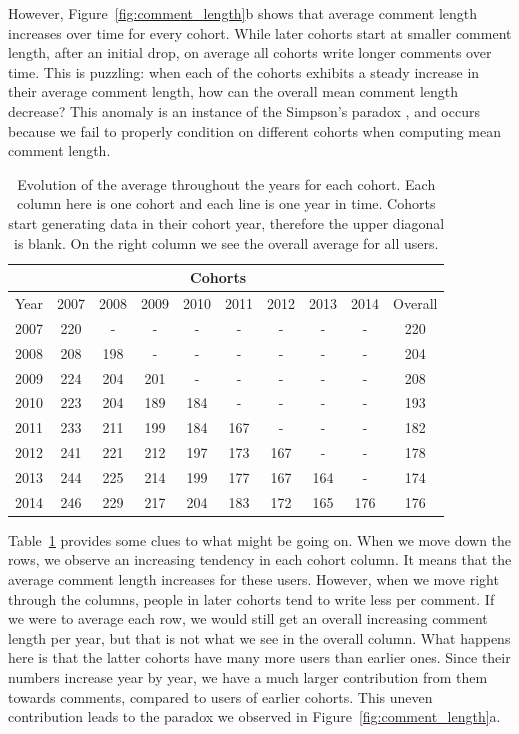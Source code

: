 However, Figure~\ref{fig:comment_length}b shows that average comment length increases over time for every cohort. While later cohorts start at smaller comment length, after an initial drop, on average all cohorts write longer comments over time.  This is puzzling: when each of the cohorts exhibits a steady increase in their average comment length, how can the overall mean comment length decrease?  This anomaly is an instance of the Simpson's paradox \cite{simpson1951}, and occurs because we fail to properly condition on different cohorts when computing mean comment length. 

\begin{table}[!tb]
\centering
\tabcolsep=0.07cm
\singlespacing
\fontsize{9pt}{10.5pt}\selectfont
\begin{tabular}{|c|c|c|c|c|c|c|c|c|c|}
\cline{2-9}
\multicolumn{1}{c|}{} & \multicolumn{8}{c|}{Cohorts} \\ \hline
Year & 2007 & 2008 & 2009 & 2010 & 2011 & 2012 & 2013 & 2014 & Overall\\ \hline
2007 & 220 & - & - & - & - & - & - & - & 220 \\ \hline
2008 & 208 & 198 & - & - & - & - & - & - & 204 \\ \hline
2009 & 224 & 204 & 201 & - & - & - & - & - & 208 \\ \hline
2010 & 223 & 204 & 189 & 184 & - & - & - & - & 193 \\ \hline
2011 & 233 & 211 & 199 & 184 & 167 & - & - & - & 182 \\ \hline
2012 & 241 & 221 & 212 & 197 & 173 & 167 & - & - & 178 \\ \hline
2013 & 244 & 225 & 214 & 199 & 177 & 167 & 164 & - & 174 \\ \hline
2014 & 246 & 229 & 217 & 204 & 183 & 172 & 165 & 176 & 176 \\ \hline
\end{tabular}
\caption{Evolution of the average throughout the years for each cohort. Each column here is one cohort and each line is one year in time. Cohorts start generating data in their cohort year, therefore the upper diagonal is blank. On the right column we see the overall average for all users.}
\label{tab:simpson}
\end{table}

Table~\ref{tab:simpson} provides some clues to what might be going on. When we move down the rows, we observe an increasing tendency in each cohort column. It means that the average comment length increases for these users. However, when we move right through the columns, people in later cohorts tend to write less per comment. If we were to average each row, we would still get an overall increasing comment length per year, but that is not what we see in the overall column. What happens here is that the latter cohorts have many more users than earlier ones. Since their numbers increase year by year, we have a much larger contribution from them towards comments, compared to users of earlier cohorts. This uneven contribution leads to the paradox we observed in Figure~\ref{fig:comment_length}a. 

